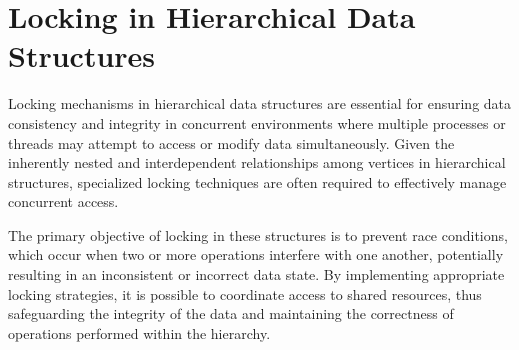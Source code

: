 





\section{Locking in Hierarchical Data Structures}
Locking mechanisms in hierarchical data structures are essential for ensuring data consistency and integrity in concurrent environments where multiple processes or threads may attempt to access or modify data simultaneously. Given the inherently nested and interdependent relationships among vertices in hierarchical structures, specialized locking techniques are often required to effectively manage concurrent access.

The primary objective of locking in these structures is to prevent race conditions, which occur when two or more operations interfere with one another, potentially resulting in an inconsistent or incorrect data state. By implementing appropriate locking strategies, it is possible to coordinate access to shared resources, thus safeguarding the integrity of the data and maintaining the correctness of operations performed within the hierarchy.

